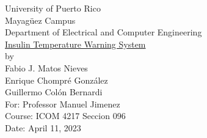 \begin{titlepage}
  \begin{center}
    \large{University of Puerto Rico\\
    Mayagüez Campus\\
    \vspace{\baselineskip}
    Department of Electrical and Computer Engineering\\}
    \vspace{6cm}
    \Huge{\underline{Insulin Temperature Warning System}\\}
    \vspace{0.5\baselineskip}
    \large by\\
    Fabio J. Matos Nieves\\
    Enrique Chompré González\\
    Guillermo Colón Bernardi\\
    \vspace{4.5cm}
    For: Professor Manuel Jimenez\\
    Course: ICOM 4217 Seccion 096\\
    Date: April 11, 2023\\
    \normalsize

  \end{center}
\end{titlepage}
